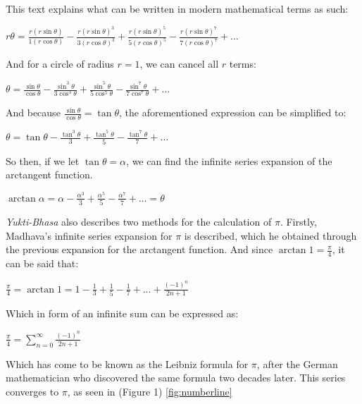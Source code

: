 

This text explains what can be written in modern mathematical terms as such:

$r \theta = \frac{r (r \sin{\theta})}{1 (r \cos{\theta})} - \frac{r (r \sin{\theta})^3}{3 (r \cos{\theta})^3} + \frac{r (r \sin{\theta})^5}{5 (r \cos{\theta})^5} - \frac{r (r \sin{\theta})^7}{7 (r \cos{\theta})^7} + \dots$

And for a circle of radius $r = 1$, we can cancel all $r$ terms:

$\theta = \frac{\sin{\theta}}{\cos{\theta}} - \frac{\sin^3{\theta}}{3 \cos^3{\theta}} + \frac{\sin^5{\theta}}{5 \cos^5{\theta}} - \frac{\sin^7{\theta}}{7 \cos^7{\theta}} + \dots$

And because $\frac{\sin{\theta}}{\cos{\theta}} = \tan{\theta}$, the aforementioned expression
can be simplified to:

$\theta = \tan{\theta} - \frac{\tan^3{\theta}}{3} + \frac{\tan^5{\theta}}{5} - \frac{\tan^7{\theta}}{7} + \dots$

So then, if we let $\tan{\theta} = \alpha$, we can find the infinite series expansion
of the arctangent function.

$\arctan{\alpha} = \alpha - \frac{\alpha^3}{3} + \frac{\alpha^5}{5} - \frac{\alpha^7}{7} + \dots = \theta$

\textit{Yukti-Bhasa} also describes two methods for the calculation of $\pi$. Firstly,
Madhava's infinite series expansion for $\pi$ is described, which he obtained through
the previous expansion for the arctangent function. And since $\arctan{1} = \frac{\pi}{4}$,
it can be said that:

$\frac{\pi}{4} = \arctan{1} = 1 - \frac{1}{3} + \frac{1}{5} - \frac{1}{7} + \dots + \frac{(-1)^n}{2n +1}$

Which in form of an infinite sum can be expressed as:

$\frac{\pi}{4} = \sum\limits_{n=0}^\infty \frac{(-1)^n}{2n +1}$

Which has come to be known as the Leibniz formula for $\pi$, after the German mathematician
who discovered the same formula two decades later. \cite{edwards_1994} This series converges 
to $\pi$, as seen in (Figure 1) \ref{fig:numberline}


